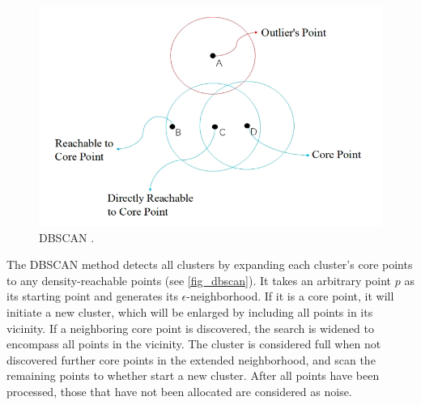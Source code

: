 \documentclass[a4paper, 12pt]{article}
\begin{document}
\begin{figure}[ht]
    \centering
    \includegraphics[width=1\textwidth]{DBSCAN.png}
    \caption{DBSCAN \citep{su2020survey}.}
    \label{fig_dbscan}
\end{figure}

The DBSCAN method \citep{ester1996density, kriegel2011density} detects all clusters by expanding each cluster's core points to any density-reachable points (see \autoref{fig_dbscan}). It takes an arbitrary point $p$ as its starting point and generates its $\epsilon$-neighborhood. If it is a core point, it will initiate a new cluster, which will be enlarged by including all points in its vicinity. If a neighboring core point is discovered, the search is widened to encompass all points in the vicinity. The cluster is considered full when not discovered further core points in the extended neighborhood, and scan the remaining points to whether start a new cluster. After all points have been processed, those that have not been allocated are considered as noise. 


\end{document}
